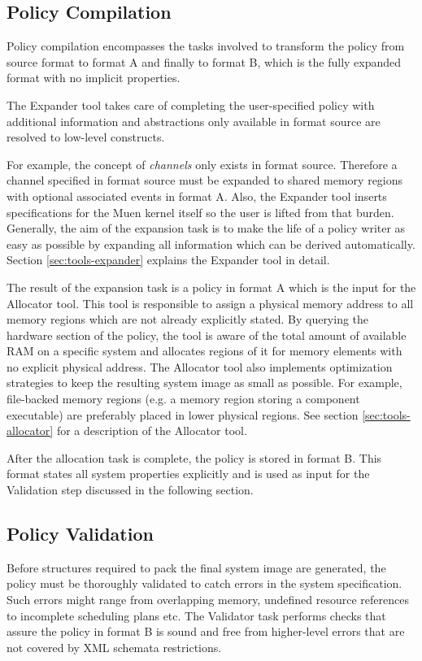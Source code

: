 \documentclass[a4paper,twoside,titlepage]{article}
\begin{document}
\subsection{Policy Compilation}
\label{sec:build-policy_compilation}
Policy compilation encompasses the tasks involved to transform the policy from
source format to format A and finally to format B, which is the fully expanded
format with no implicit properties.

The Expander tool takes care of completing the user-specified policy with
additional information and abstractions only available in format source are
resolved to low-level constructs.

For example, the concept of \emph{channels} only exists in format source.
Therefore a channel specified in format source must be expanded to shared memory
regions with optional associated events in format A.  Also, the Expander tool
inserts specifications for the Muen kernel itself so the user is lifted from
that burden. Generally, the aim of the expansion task is to make the life of a
policy writer as easy as possible by expanding all information which can be
derived automatically. Section \ref{sec:tools-expander} explains the Expander
tool in detail.

The result of the expansion task is a policy in format A which is the input for
the Allocator tool. This tool is responsible to assign a physical memory
address to all memory regions which are not already explicitly stated. By
querying the hardware section of the policy, the tool is aware of the total
amount of available RAM on a specific system and allocates regions of it for
memory elements with no explicit physical address.  The Allocator tool also
implements optimization strategies to keep the resulting system image as small
as possible.  For example, file-backed memory regions (e.g. a memory region
storing a component executable) are preferably placed in lower physical
regions. See section \ref{sec:tools-allocator} for a description of the
Allocator tool.

After the allocation task is complete, the policy is stored in format B. This
format states all system properties explicitly and is used as input for the
Validation step discussed in the following section.

\subsection{Policy Validation}
\label{subsec:policy_validation}
Before structures required to pack the final system image are generated, the
policy must be thoroughly validated to catch errors in the system
specification.  Such errors might range from overlapping memory, undefined
resource references to incomplete scheduling plans etc. The Validator task
performs checks that assure the policy in format B is sound and free from
higher-level errors that are not covered by XML schemata restrictions.
\end{document}
